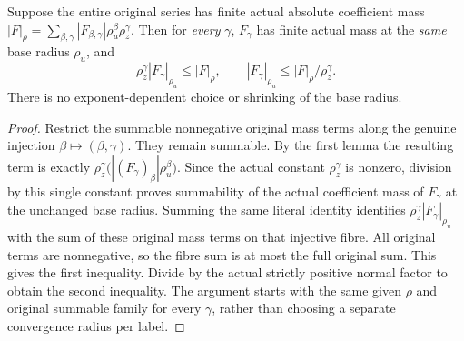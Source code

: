 \begin{theorem}
\label{hir:actual-relative-coefficient-same-radius-mass}
\leanok
Suppose the entire original series has finite actual absolute coefficient
mass $|F|_\rho=\sum_{\beta,\gamma}|F_{\beta,\gamma}|\rho_u^\beta\rho_z^\gamma$.
Then for \emph{every} $\gamma$, $F_\gamma$ has finite actual mass at the
\emph{same} base radius $\rho_u$, and
\[
 \rho_z^\gamma |F_\gamma|_{\rho_u}\leq |F|_\rho,
 \qquad
 |F_\gamma|_{\rho_u}\leq |F|_\rho/\rho_z^\gamma.
\]
There is no exponent-dependent choice or shrinking of the base radius.
\end{theorem}
\begin{proof}
Restrict the summable nonnegative original mass terms along the genuine
injection $\beta\mapsto(\beta,\gamma)$. They remain summable.
By the first lemma the resulting term is exactly
$\rho_z^\gamma\bigl(|(F_\gamma)_\beta|\rho_u^\beta\bigr)$.
Since the actual constant $\rho_z^\gamma$ is nonzero, division by this
single constant proves summability of the actual coefficient mass of
$F_\gamma$ at the unchanged base radius. Summing the same literal
identity identifies $\rho_z^\gamma|F_\gamma|_{\rho_u}$ with the sum
of these original mass terms on that injective fibre. All original
terms are nonnegative, so the fibre sum is at most the full original
sum. This gives the first inequality. Divide by the actual strictly
positive normal factor to obtain the second inequality. The argument
starts with the same given $\rho$ and original summable family for every
$\gamma$, rather than choosing a separate convergence radius per label.
\end{proof}

